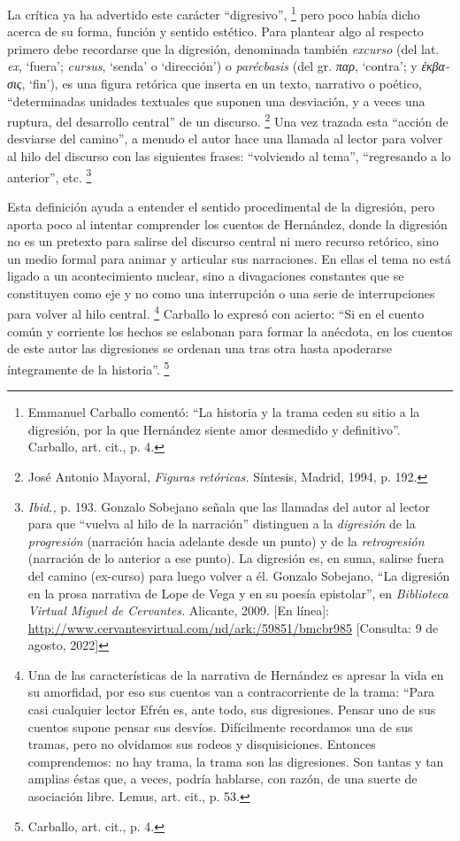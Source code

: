 \documentclass[14pt,twoside,final]{extbook} %
\let\oldfootnote\footnote
\renewcommand\footnote[1]{%
\oldfootnote{\hspace{1mm}#1}}
\begin{document}
La crítica ya ha advertido este carácter ``digresivo'',\footnote{Emmanuel Carballo comentó: ``La historia y la trama ceden su sitio a la digresión, por la que Hernández siente amor desmedido y definitivo''. Carballo, art. cit., p. 4.} pero poco había dicho acerca de su forma, función y sentido estético. Para plantear algo al respecto primero debe recordarse que la digresión, denominada
también \emph{excurso} (del lat. \emph{ex}, `fuera'; \emph{cursus}, `senda' o `dirección') o \emph{parécbasis} (del gr. \textgreek{\itshape παρ}, `contra'; y \textgreek{\itshape έκβασις}, `fin'), es una figura retórica que inserta en un texto, narrativo o poético, ``determinadas unidades textuales que suponen una desviación, y a veces una ruptura, del desarrollo central'' de un discurso.\footnote{José Antonio Mayoral, \emph{Figuras retóricas.} Síntesis, Madrid, 1994, p. 192.} Una vez trazada esta ``acción de desviarse del camino'', a menudo el autor hace una llamada al lector para volver al hilo del discurso con las siguientes frases: ``volviendo al tema'',
``regresando a lo anterior'', etc.\footnote{\emph{Ibid.,} p. 193. Gonzalo Sobejano señala que las llamadas del autor al lector para que ``vuelva al hilo de la narración'' distinguen a la \emph{digresión} de la \emph{progresión} (narración hacia adelante desde un punto) y de la \emph{retrogresión} (narración de lo anterior a ese punto). La digresión es, en suma, salirse fuera del camino (ex-curso) para luego volver a él. Gonzalo Sobejano, ``La digresión en la prosa narrativa de Lope de Vega y en su poesía epistolar'', en \emph{Biblioteca Virtual Miguel de Cervantes.} Alicante, 2009. [En línea]: \url{http://www.cervantesvirtual.com/nd/ark:/59851/bmcbr985} [Consulta: 9 de agosto, 2022]}

Esta definición ayuda a entender el sentido procedimental de la digresión, pero aporta poco al intentar comprender los cuentos de Hernández, donde la digresión no es un pretexto para salirse del
discurso central ni mero recurso retórico, sino un medio formal para animar y articular sus narraciones. En ellas el tema no está ligado a un acontecimiento nuclear, sino a divagaciones constantes que se constituyen como eje y no como una interrupción o una serie de interrupciones para volver al hilo central.\footnote{Una de las características de la narrativa de Hernández es apresar la vida en su amorfidad, por eso sus cuentos van a contracorriente de la trama: ``Para casi cualquier lector Efrén es, ante todo, sus digresiones. Pensar uno de sus cuentos supone pensar sus desvíos. Difícilmente recordamos una de sus tramas, pero no olvidamos sus rodeos y disquisiciones. Entonces comprendemos: no hay trama, la trama son las digresiones. Son tantas y tan amplias éstas que, a veces, podría hablarse, con razón, de una suerte de asociación libre. Lemus, art. cit., p. 53.} Carballo lo expresó con acierto: ``Si en el cuento común y corriente los hechos se eslabonan para formar la anécdota, en los cuentos de este autor las digresiones se ordenan una tras otra hasta apoderarse íntegramente de la historia''.\footnote{Carballo, art. cit., p. 4.}
\end{document}
